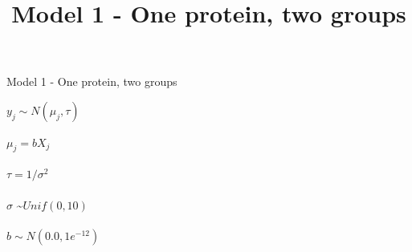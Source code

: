 \documentclass[12pt]{article}
\title{Model 1 - One protein, two groups}
\begin{document}
\begin{center}{\LARGE Model 1 - One protein, two groups}\end{center} 

\hspace{0.2in}

$y_j \sim N(\mu_j, \tau)$ 
\\

\\
$\mu_j = bX_j$
\\

\\
$\tau = 1/\sigma^2$
\\

\\
$\sigma$ \sim $Unif(0, 10)$
\\

\\
$b \sim N(0.0, 1e^{-12})$
\\

\\

\\

\\
\\
\\
\\
\\

\\

\\
\end{document}
